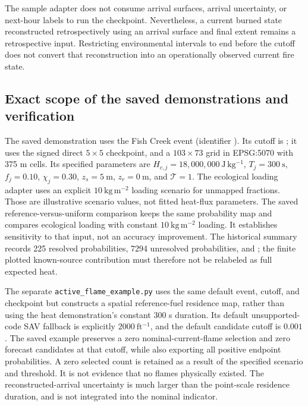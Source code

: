 \documentclass[11pt,a4paper]{article}
\begin{document}
The sample adapter does not consume arrival surfaces, arrival uncertainty,
or next-hour labels to run the checkpoint. Nevertheless, a current burned
state reconstructed retrospectively using an arrival surface and final
extent remains a retrospective input. Restricting environmental intervals
to end before the cutoff does not convert that reconstruction into an
operationally observed current fire state.

\subsection{Exact scope of the saved demonstrations and verification}
\label{sec:heat-demo}

The saved  demonstration uses the Fish Creek
event (identifier ). Its cutoff is
; it uses the signed direct $5\times5$ checkpoint,
and a $103\times73$ grid in EPSG:5070 with 375 m cells. Its specified
parameters are $H_{c,j}=18{,}000{,}000\ \mathrm{J\,kg^{-1}}$,
$T_j=300\ \mathrm{s}$, $f_j=0.10$, $\chi_j=0.30$,
$z_s=5\ \mathrm m$, $z_r=0\ \mathrm m$, and $\mathcal T=1$.
The ecological loading adapter uses an explicit
$10\ \mathrm{kg\,m^{-2}}$ loading scenario for unmapped fractions.
Those are illustrative scenario values, not fitted heat-flux parameters.
The saved reference-versus-uniform comparison keeps the same probability
map and compares ecological loading with constant
$10\ \mathrm{kg\,m^{-2}}$ loading. It establishes sensitivity to that
input, not an accuracy improvement. The historical summary records
225 resolved probabilities, 7294 unresolved probabilities, and
; the finite plotted
known-source contribution must therefore not be relabeled as full expected
heat.\cite{codeheat}

The separate \texttt{active\_flame\_example.py} uses the same default event,
cutoff, and checkpoint but constructs a spatial reference-fuel residence
map, rather than using the heat demonstration's constant 300 s duration.
Its default unsupported-code SAV fallback is explicitly
$2000\ \mathrm{ft^{-1}}$, and the default candidate cutoff is $0.001$.
The saved example preserves a zero nominal-current-flame selection and
zero forecast candidates at that cutoff, while also exporting all positive
endpoint probabilities. A zero selected count is retained as a result of
the specified scenario and threshold. It is not evidence that no flames
physically existed. The reconstructed-arrival uncertainty is much larger
than the point-scale residence duration, and is not integrated into the
nominal indicator.
\end{document}
